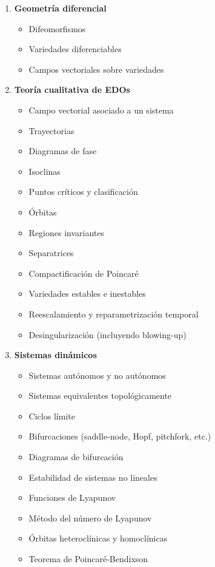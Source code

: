 \begin{enumerate}
    	\item \textbf{Geometría diferencial}
    	\begin{itemize}
    		\item Difeomorfismos
    		\item Variedades diferenciables
    		\item Campos vectoriales sobre variedades
    	\end{itemize}
    	
    	\item \textbf{Teoría cualitativa de EDOs}
    	\begin{itemize}
    		\item Campo vectorial asociado a un sistema \checkmark
    		\item Trayectorias \checkmark
    		\item Diagramas de fase \checkmark
    		\item Isoclinas \checkmark
    		\item Puntos críticos y clasificación \checkmark
    		\item Órbitas
    		\item Regiones invariantes
    		\item Separatrices
    		\item Compactificación de Poincaré
    		\item Variedades estables e inestables
    		\item Reescalamiento y reparametrización temporal
    		\item Desingularización (incluyendo blowing-up)
    	\end{itemize}
    	
    	\item \textbf{Sistemas dinámicos}
    	\begin{itemize}
    		\item Sistemas autónomos y no autónomos \checkmark
    		\item Sistemas equivalentes topológicamente
    		\item Ciclos límite
    		\item Bifurcaciones (saddle-node, Hopf, pitchfork, etc.)
    		\item Diagramas de bifurcación
    		\item Estabilidad de sistemas no lineales
    		\item Funciones de Lyapunov
    		\item Método del número de Lyapunov
    		\item Órbitas heteroclínicas y homoclínicas
    		\item Teorema de Poincaré-Bendixson
    	\end{itemize}
    	

\end{enumerate}
